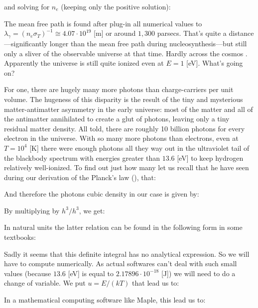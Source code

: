 	and solving for $n_e$ (keeping only the positive solution):
	
	The mean free path is found after plug-in all numerical values to $\lambda_\gamma=(n_e\sigma_T)^{-1}\cong 4.07\cdot 10^{19}$ [m] or around $1,300$ parsecs. That's quite a distance—significantly longer than the mean free path during nucleosynthesis—but still only a sliver of the observable universe at that time. Hardly \og across the cosmos \fg{}. Apparently the universe is still quite ionized even at $E=1$ [eV]. What's going on?
	
	For one, there are hugely many more photons than charge-carriers per unit volume. The hugeness of this disparity is the result of the tiny and mysterious matter-antimatter asymmetry in the early universe: most of the matter and all of the antimatter annihilated to create a glut of photons, leaving only a tiny residual matter density. All told, there are roughly 10 billion photons for every electron in the universe. With so many more photons than electrons, even at $T=10^{4}$ [K] there were enough photons all they way out in the ultraviolet tail of the blackbody spectrum with energies greater than $13.6$ [eV] to keep hydrogen relatively well-ionized. To find out just how many let us recall that he have seen during our derivation of the Planck's law (), that:
	
	And therefore the photons cubic density in our case is given by:
	
	By multiplying by $h^3/h^3$, we get:
	
	\begin{tcolorbox}[title=Remark,colframe=black,arc=10pt]
	In natural units the latter relation can be found in the following form in some textbooks:
	
	\end{tcolorbox}
	Sadly it seems that this definite integral has no analytical expression. So we will have to compute numerically. As actual softwares can't deal with such small values (because $13.6$ [eV] is equal to $2.17896\cdot 10^{-18}$ [J]) we will need to do a change of variable. We put $u=E/(kT)$ that lead us to:
	
	In a mathematical computing software like Maple, this lead us to:
	
